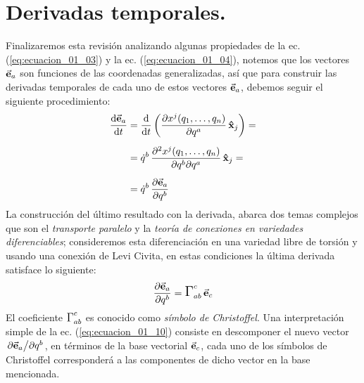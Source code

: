\documentclass[12pt]{article}
\begin{document}
\section{Derivadas temporales.}

Finalizaremos esta revisión analizando algunas propiedades de la ec.(\ref{eq:ecuacion_01_03}) y la ec. (\ref{eq:ecuacion_01_04}), notemos que los vectores $\va{e}_{a}$ son funciones de las coordenadas generalizadas, así que para construir las derivadas temporales de cada uno de estos vectores $\va{e}_{a}$, debemos seguir el siguiente procedimiento:
\begin{align}
\begin{aligned}[b]
\dv{\va{e}_{a}}{t} &= \dv{t} \left( \pdv{x^{j} (q_{1}, \ldots, q_{n})}{q^{a}} \, \vu{x}_{j} \right) = \\[0.5em]
&= \dot{q}^{b} \, \pdv[2]{x^{j} (q_{1}, \ldots, q_{n})}{q^{b}}{q^{a}} \, \vu{x}_{j} = \\[0.5em]
&= \dot{q}^{b} \, \pdv{\va{e}_{a}}{q^{b}}
\end{aligned}
\label{eq:ecuacion_01_09}
\end{align}
La construcción del último resultado con la derivada, abarca dos temas complejos que son el \emph{transporte paralelo} y la \emph{teoría de conexiones en variedades diferenciables}; consideremos esta diferenciación en una variedad libre de torsión y usando una conexión de Levi Civita, en estas condiciones la última derivada satisface lo siguiente:
\begin{align}
\pdv{\va{e}_{a}}{q^{b}} = {\mathlarger{\mathlarger\Gamma}}_{ab}^{c} \, \va{e}_{c}
\label{eq:ecuacion_01_10}
\end{align}
El coeficiente ${\mathlarger{\mathlarger\Gamma}}_{ab}^{c}$ es conocido como \emph{símbolo de Christoffel}. Una interpretación simple de la ec. (\ref{eq:ecuacion_01_10}) consiste en descomponer el nuevo vector $\pdv*{\va{e}_{a}}{q^{b}}$, en términos de la base vectorial $\va{e}_{c}$, cada uno de los símbolos de Christoffel corresponderá a las componentes de dicho vector en la base mencionada.
\end{document}
